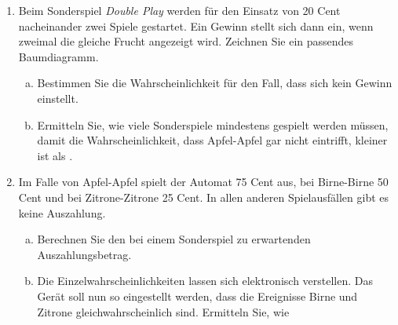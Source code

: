 \begin{exercise}
\begin{minipage}[t]{0.40\textwidth}
{%
      }%
    \end{minipage}
    \begin{enumerate}[1)]
      \setlength   {\followlen}{\introlen}%
      \addtolength {\followlen}{-\leftskip}%
      \addtolength {\followlen}{-\leftmargini}%
      \item \begin{minipage}[t]{\followlen}
              Beim Sonderspiel \textit{Double Play} werden für den Einsatz
              von 20 Cent nacheinander zwei Spiele gestartet. Ein Gewinn
              stellt sich dann ein, wenn zweimal die gleiche Frucht
              angezeigt wird. Zeichnen Sie ein passendes Baumdiagramm.
            \end{minipage}
            \begin{enumerate}[a)]
              \item Bestimmen Sie die Wahrscheinlichkeit für den Fall,
                    dass sich kein Gewinn einstellt.
              \item Ermitteln Sie, wie viele Sonderspiele mindestens
                    gespielt werden müssen, damit die Wahrscheinlichkeit,
                    dass \glqq Apfel-Apfel\grqq{} gar nicht eintrifft,
                    kleiner ist als .
            \end{enumerate}
      \item Im Falle von \glqq Apfel-Apfel\grqq{} spielt der Automat
            75 Cent aus, bei \glqq Birne-Birne\grqq{} 50 Cent und
            bei \glqq Zitrone-Zitrone\grqq{} 25 Cent.
            In allen anderen Spielausfällen gibt es keine Auszahlung.
            \begin{enumerate}[a)]
              \item Berechnen Sie den bei einem Sonderspiel zu
                    erwartenden Auszahlungsbetrag.
              \item Die Einzelwahrscheinlichkeiten lassen sich
                    elektronisch verstellen. Das Gerät soll nun so
                    eingestellt werden, dass die Ereignisse
                    \glqq Birne\grqq{} und \glqq Zitrone\grqq{}
                    gleichwahrscheinlich sind. Ermitteln Sie, wie

\end{enumerate}
\end{enumerate}
\end{exercise}
